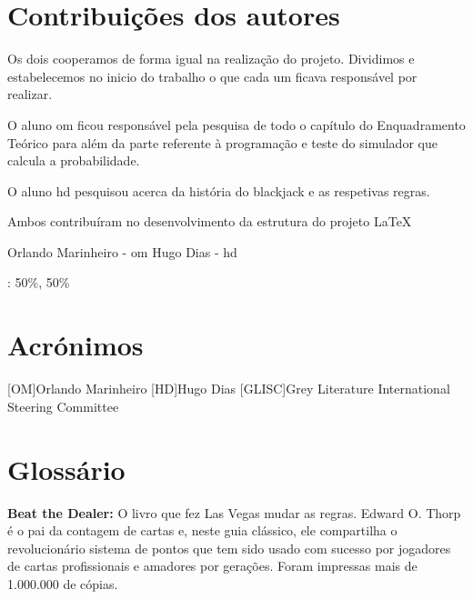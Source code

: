 \documentclass{report}
\begin{document}

\chapter*{Contribuições dos autores}

Os dois cooperamos de forma igual na realização do projeto. Dividimos e estabelecemos no inicio do trabalho o que cada um ficava responsável por realizar. \newline

O aluno \ac{om} ficou responsável pela pesquisa de todo o capítulo do Enquadramento Teórico para além da parte referente à programação e teste do simulador que calcula a probabilidade. \newline

O aluno \ac{hd} pesquisou acerca da história do blackjack e as respetivas regras. \newline

Ambos contribuíram no desenvolvimento da estrutura do projeto \LaTeX \newline

Orlando Marinheiro - \ac{om}
Hugo Dias - \ac{hd}
\vspace{10pt}

\autores : 50\%, 50\%\\

\chapter*{Acrónimos}
\begin{acronym}
[OM]{Orlando Marinheiro}
[HD]{Hugo Dias}
[GLISC]{Grey Literature International Steering Committee}
\end{acronym}

\chapter*{Glossário}

\hypertarget{Glossário}{\textbf{Beat the Dealer:} O livro que fez Las Vegas mudar as regras. Edward O. Thorp é o pai da contagem de cartas e, neste guia clássico, ele compartilha o revolucionário sistema de pontos que tem sido usado com sucesso por jogadores de cartas profissionais e amadores por gerações.
Foram impressas mais de 1.000.000 de cópias.}
\newline
\end{document}
